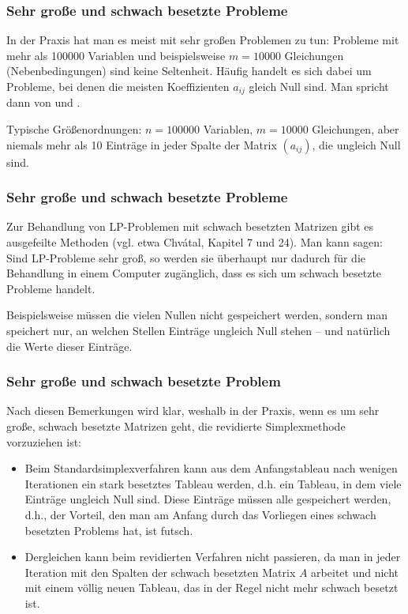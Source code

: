 \documentclass[smaller]{beamer}
\begin{document}
\begin{frame}
 \frametitle{Sehr große und schwach besetzte Probleme}
In der \alert{Praxis} hat man es meist mit \alert{sehr großen Problemen} zu tun: Probleme mit mehr als 100000 Variablen und beispielsweise $m=10000$ Gleichungen (Nebenbedingungen) sind keine Seltenheit. Häufig handelt es sich dabei um \alert{Probleme, bei denen die meisten Koeffizienten $a_{ij}$ gleich Null sind}. Man spricht dann von  und . \\ \vspace*{0.2cm} 

Typische Größen\-ord\-nungen: $n=100000$ Variablen, $m=10000$ Gleichungen, aber niemals mehr als 10 Einträge in jeder Spalte der Matrix $(a_{ij})$, die ungleich Null sind.
\end{frame}

\begin{frame}
 \frametitle{Sehr große und schwach besetzte Probleme}
Zur Behandlung von LP-Problemen mit schwach besetzten Matrizen gibt es ausgefeilte Methoden (vgl. etwa Chvátal, Kapitel 7 und 24). Man kann sagen: \alert{Sind LP-Probleme sehr groß, so werden sie überhaupt nur dadurch für die Behandlung in einem Computer zugänglich, dass es sich um schwach besetzte Probleme handelt}. \\ \vspace*{0.2cm}

Beispielsweise müssen die vielen Nullen nicht gespeichert werden, sondern man speichert nur, an welchen Stellen Einträge ungleich Null stehen -- und natürlich die Werte dieser Einträge.
\end{frame}

\begin{frame}
 \frametitle{Sehr große und schwach besetzte Problem}
 Nach diesen Bemerkungen wird klar, weshalb in der Praxis, wenn es um sehr große, schwach besetzte Matrizen geht, \alert{die revidierte Simplexmethode vorzuziehen ist:}
\begin{itemize}
	\item Beim \alert{Standardsimplexverfahren} kann aus dem Anfangstableau nach wenigen Iterationen ein {\glqq}stark besetztes Tableau{\grqq} werden, d.h. ein Tableau, in dem viele Einträge ungleich Null sind. Diese Einträge müssen alle gespeichert werden, d.h., der Vorteil, den man am Anfang durch das Vorliegen eines schwach besetzten Problems hat, ist {\glqq}futsch{\grqq}.
	\item Dergleichen kann beim \alert{revidierten Verfahren} nicht passieren, da man in jeder Iteration mit den Spalten der schwach besetzten Matrix $A$ arbeitet und nicht mit einem völlig neuen Tableau, das in der Regel nicht mehr schwach besetzt ist.
\end{itemize}
\end{frame}
\end{document}
